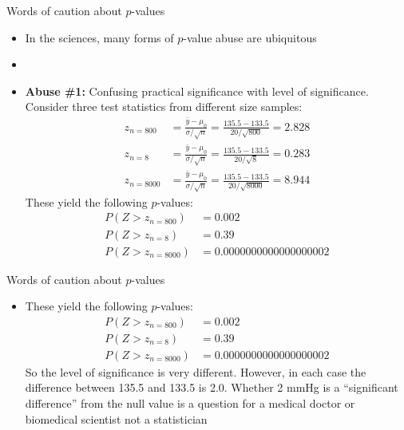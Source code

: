 \documentclass[xcolor=dvipsnames]{beamer}
\begin{document}
\begin{frame}{Words of caution about $p$-values}
	\begin{itemize}
		\item In the sciences, many forms of $p$-value abuse are ubiquitous  \pause
		\item[]
		\item \textbf{Abuse \#1:} Confusing practical significance with level of significance. Consider three test statistics from different size samples:  \pause
		\begin{align*}
		z_{n=800} &= \frac{\bar{y} - \mu_0}{\sigma / \sqrt{n}} = \frac{135.5 - 133.5}{20 / \sqrt{800}} = 2.828 \\
		z_{n=8} &= \frac{\bar{y} - \mu_0}{\sigma / \sqrt{n}} = \frac{135.5 - 133.5}{20 / \sqrt{8}} = 0.283 \\
		z_{n=8000} &= \frac{\bar{y} - \mu_0}{\sigma / \sqrt{n}} = \frac{135.5 - 133.5}{20 / \sqrt{8000}} = 8.944
		\end{align*}  \pause
		These yield the following $p$-values:  \pause
		\begin{align*}
			P(Z >z_{n=800}) &= 0.002 \\
			P(Z >z_{n=8}) &= 0.39 \\
			P(Z >z_{n=8000}) &= 0.0000000000000000002
		\end{align*}
	\end{itemize}
\end{frame}

\begin{frame}{Words of caution about $p$-values}
\begin{itemize}
	\item These yield the following $p$-values:
	\begin{align*}
	P(Z >z_{n=800}) &= 0.002 \\
	P(Z >z_{n=8}) &= 0.39 \\
	P(Z >z_{n=8000}) &= 0.0000000000000000002
	\end{align*}
	So the level of significance is very different. However, in each case the difference between 135.5 and 133.5 is 2.0. Whether 2 mmHg is a ``significant difference'' from the null value is a question for a medical doctor or biomedical scientist not a statistician
\end{itemize}
\end{frame}
\end{document}
